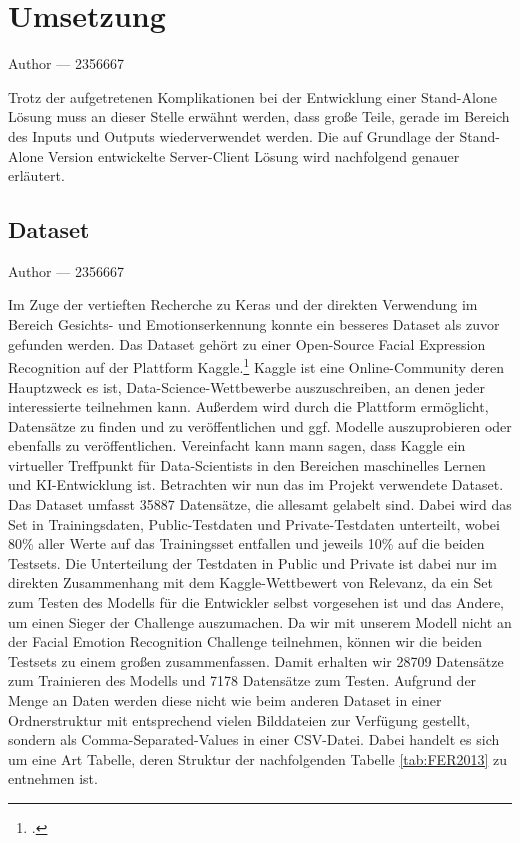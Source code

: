 \documentclass[12pt, a4paper]{report}
\makeatletter
\newcommand{\sectionauthor}[1]{%
  {\parindent0pt\vspace*{-5pt}%
  \large{Author --- }
  \linespread{1.1}\large\scshape#1%
  \par\nobreak\vspace*{35pt} }
  \@afterheading%
}
\makeatother
\begin{document}
\section{Umsetzung}
\sectionauthor{2356667}
Trotz der aufgetretenen Komplikationen bei der Entwicklung einer Stand-Alone Lösung muss an dieser Stelle erwähnt werden, dass große Teile, gerade im Bereich des Inputs und Outputs wiederverwendet werden. Die auf Grundlage der Stand-Alone Version entwickelte Server-Client Lösung wird nachfolgend genauer erläutert.

\subsection{Dataset}
\sectionauthor{2356667}
Im Zuge der vertieften Recherche zu Keras und der direkten Verwendung im Bereich Gesichts- und Emotionserkennung konnte ein besseres Dataset als zuvor gefunden werden. Das Dataset gehört zu einer Open-Source Facial Expression Recognition auf der Plattform Kaggle.\footcite[Vgl.][]{FER-Challenge} Kaggle ist eine Online-Community deren Hauptzweck es ist, Data-Science-Wettbewerbe auszuschreiben, an denen jeder interessierte teilnehmen kann. Außerdem wird durch die Plattform ermöglicht, Datensätze zu finden und zu veröffentlichen und ggf. Modelle auszuprobieren oder ebenfalls zu veröffentlichen. Vereinfacht kann mann sagen, dass Kaggle ein virtueller Treffpunkt für Data-Scientists in den Bereichen maschinelles Lernen und KI-Entwicklung ist.\newline
Betrachten wir nun das im Projekt verwendete Dataset. Das Dataset umfasst 35887 Datensätze, die allesamt gelabelt sind. Dabei wird das Set in Trainingsdaten, Public-Testdaten und Private-Testdaten unterteilt, wobei 80\% aller Werte auf das Trainingsset entfallen und jeweils 10\% auf die beiden Testsets. Die Unterteilung der Testdaten in Public und Private ist dabei nur im direkten Zusammenhang mit dem Kaggle-Wettbewert von Relevanz, da ein Set zum Testen des Modells für die Entwickler selbst vorgesehen ist und das Andere, um einen Sieger der Challenge auszumachen. Da wir mit unserem Modell nicht an der Facial Emotion Recognition Challenge teilnehmen, können wir die beiden Testsets zu einem großen zusammenfassen. Damit erhalten wir 28709 Datensätze zum Trainieren des Modells und 7178 Datensätze zum Testen. Aufgrund der Menge an Daten werden diese nicht wie beim anderen Dataset in einer Ordnerstruktur mit entsprechend vielen Bilddateien zur Verfügung gestellt, sondern als Comma-Separated-Values in einer CSV-Datei. Dabei handelt es sich um eine Art Tabelle, deren Struktur der nachfolgenden Tabelle \ref{tab:FER2013} zu entnehmen ist.
\end{document}
